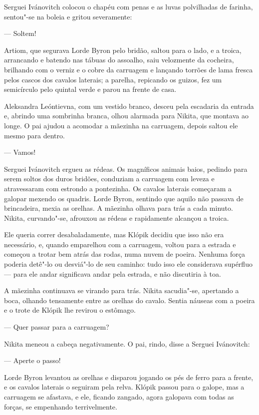 Serguei Ivánovitch colocou o chapéu com penas e as luvas polvilhadas de
farinha, sentou"-se na boleia e gritou severamente:

--- Soltem!

Artiom, que segurava Lorde Byron pelo bridão, saltou para o lado, e a
troica, arrancando e batendo nas tábuas do assoalho, saiu velozmente da
cocheira, brilhando com o verniz e o cobre da carruagem e lançando
torrões de lama fresca pelos cascos dos cavalos laterais; a parelha,
repicando os guizos, fez um semicírculo pelo quintal verde e parou na
frente de casa.

Aleksandra Leóntievna, com um vestido branco, desceu pela escadaria da
entrada e, abrindo uma sombrinha branca, olhou alarmada para Nikita, que
montava ao longe. O pai ajudou a acomodar a mãezinha na carruagem,
depois saltou ele mesmo para dentro.

--- Vamos!

Serguei Ivánovitch ergueu as rédeas. Os magníficos animais baios,
pedindo para serem soltos dos duros bridões, conduziam a carruagem com
leveza e atravessaram com estrondo a pontezinha. Os cavalos laterais
começaram a galopar mexendo os quadris. Lorde Byron, sentindo que aquilo
não passava de brincadeira, mexia as orelhas. A mãezinha olhava para
trás a cada minuto. Nikita, curvando"-se, afrouxou as rédeas e
rapidamente alcançou a troica.

Ele queria correr desabaladamente, mas Klópik decidiu que isso não era
necessário, e, quando emparelhou com a carruagem, voltou para a estrada
e começou a trotar bem atrás das rodas, numa nuvem de poeira. Nenhuma
força poderia detê"-lo ou desviá"-lo de seu caminho: tudo isso ele
considerava supérfluo --- para ele andar significava andar pela
estrada, e não discutiria à toa.

A mãezinha continuava se virando para trás. Nikita sacudia"-se, apertando
a boca, olhando tensamente entre as orelhas do cavalo. Sentia náuseas
com a poeira e o trote de Klópik lhe revirou o estômago.

--- Quer passar para a carruagem?

Nikita meneou a cabeça negativamente. O pai, rindo, disse a Serguei
Ivánovitch:

--- Aperte o passo!

Lorde Byron levantou as orelhas e disparou jogando os pés de ferro para
a frente, e os cavalos laterais o seguiram pela relva. Klópik passou
para o galope, mas a carruagem se afastava, e ele, ficando zangado,
agora galopava com todas as forças, se empenhando terrivelmente.


